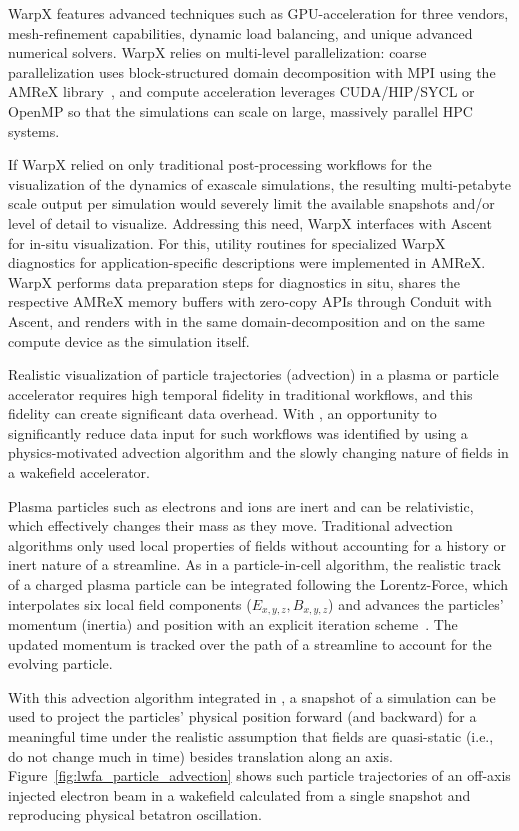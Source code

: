 WarpX features advanced techniques such as GPU-acceleration for three vendors, mesh-refinement capabilities, dynamic load balancing, and unique advanced numerical solvers.
WarpX relies on multi-level parallelization: coarse parallelization uses block-structured domain decomposition with MPI using the AMReX library~\citep{Zhang2019}, and compute acceleration leverages CUDA/HIP/SYCL or OpenMP so that the simulations can scale on large, massively parallel HPC systems.

If WarpX relied on only traditional post-processing workflows for the visualization of the dynamics of exascale simulations, the resulting multi-petabyte scale output per simulation would severely limit the available snapshots and/or level of detail to visualize.
Addressing this need, WarpX interfaces with Ascent for in-situ visualization.
For this, utility routines for specialized WarpX diagnostics for application-specific descriptions were implemented in AMReX.
WarpX performs data preparation steps for diagnostics in situ, shares the respective AMReX memory buffers with zero-copy APIs through Conduit with Ascent, and renders with \vtkm in the same domain-decomposition and on the same compute device as the simulation itself.

Realistic visualization of particle trajectories (advection) in a plasma or particle accelerator requires high temporal fidelity in traditional workflows, and this fidelity can create significant data overhead.
With \vtkm, an opportunity to significantly reduce data input for such workflows was identified by using a physics-motivated advection algorithm and the slowly changing nature of fields in a wakefield accelerator.

Plasma particles such as electrons and ions are inert and can be relativistic, which effectively changes their mass as they move.
Traditional advection algorithms only used local properties of fields without accounting for a history or inert nature of a streamline.
As in a particle-in-cell algorithm, the realistic track of a charged plasma particle can be integrated following the Lorentz-Force, which interpolates six local field components ($E_{x,y,z}, B_{x,y,z}$) and advances the particles' momentum (inertia) and position with an explicit iteration scheme~\citep{Boris1970}.
The updated momentum is tracked over the path of a streamline to account for the evolving particle.

With this advection algorithm integrated in \vtkm, a snapshot of a simulation can be used to project the particles' physical position forward (and backward) for a meaningful time under the realistic assumption that fields are quasi-static (i.e., do not change much in time) besides translation along an axis.
Figure~\ref{fig:lwfa_particle_advection} shows such particle trajectories of an off-axis injected electron beam in a wakefield calculated from a single snapshot and reproducing physical betatron oscillation.

